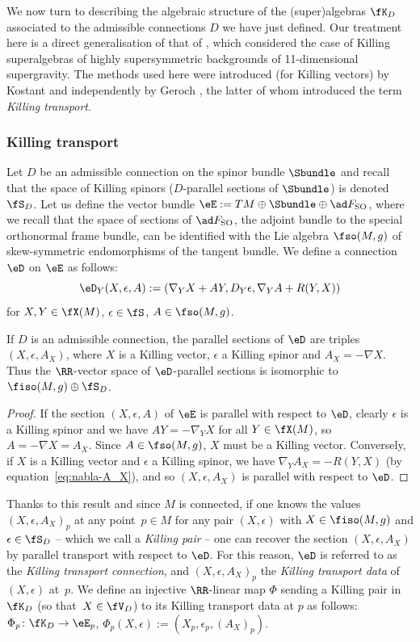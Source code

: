 We now turn to describing the algebraic structure of the (super)algebras $\fK_D$ associated to the admissible connections $D$ we have just defined. Our treatment here is a direct generalisation of that of \cite{Figueroa-OFarrill2017_1}, which considered the case of Killing superalgebras of highly supersymmetric backgrounds of 11-dimensional supergravity. The methods used here were introduced (for Killing vectors) by Kostant \cite{Kostant1955} and independently by Geroch \cite{Geroch1969}, the latter of whom introduced the term \emph{Killing transport}.

\subsubsection{Killing transport}

Let $D$ be an admissible connection on the spinor bundle $\Sbundle$ and recall that the space of Killing spinors ($D$-parallel sections of $\Sbundle$) is denoted $\fS_D$. Let us define the vector bundle
$\eE := TM\oplus\Sbundle\oplus\ad F_{\rm SO}$,
where we recall that the space of sections of $\ad F_{\rm SO}$, the adjoint bundle to the special orthonormal frame bundle, can be identified with the Lie algebra $\fso(M,g)$ of skew-symmetric endomorphisms of the tangent bundle. We define a connection $\eD$ on $\eE$ as follows:
\[
	\eD_Y(X,\epsilon,A) := (\nabla_Y X + AY,D_Y\epsilon,\nabla_Y A + R(Y,X))
\]
for $X,Y\in\fX(M)$, $\epsilon\in\fS$, $A\in\fso(M,g)$.

\begin{Proposition}\label{prop:killing-transport}
	If $D$ is an admissible connection, the parallel sections of $\eD$ are triples $(X,\epsilon,A_X)$, where $X$ is a Killing vector, $\epsilon$ a Killing spinor and $A_X=-\nabla X$. Thus the $\RR$-vector space of $\eD$-parallel sections is isomorphic to $\fiso(M,g)\oplus\fS_D$.
\end{Proposition}
\begin{proof}
If the section $(X,\epsilon,A)$ of $\eE$ is parallel with respect to $\eD$, clearly $\epsilon$ is a Killing spinor and we have $AY = -\nabla_Y X$ for all $Y\in\fX(M)$, so $A = -\nabla X = A_X$. Since $A\in\fso(M,g)$, $X$ must be a Killing vector. Conversely, if $X$ is a Killing vector and $\epsilon$ a Killing spinor, we have $\nabla_Y A_X = -R(Y,X)$ (by equation~\eqref{eq:nabla-A_X}), and so $(X,\epsilon,A_X)$ is parallel with respect to $\eD$.
\end{proof}

Thanks to this result and since $M$ is connected, if one knows the values $(X,\epsilon,A_X)_p$ at any point~${p\in M}$ for any pair $(X,\epsilon)$ with $X\in\fiso(M,g)$ and $\epsilon\in\fS_D$ -- which we call a \emph{Killing pair} -- one can recover the section $(X,\epsilon,A_X)$ by parallel transport with respect to $\eD$. For this reason, $\eD$ is referred to as the \emph{Killing transport connection}, and $(X,\epsilon,A_X)_p$ the \emph{Killing transport data} of~$(X,\epsilon)$ at~$p$. We define an injective $\RR$-linear map $\Phi$ sending a Killing pair in~$\fK_D$ (so that~${X\in\fV_D}$) to its Killing transport data at $p$ as follows:
$\Phi_p\colon \fK_D\to\eE_p$,
	$\Phi_p(X,\epsilon):=(X_p,\epsilon_p,(A_X)_p)$.


